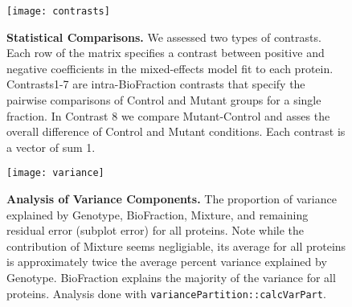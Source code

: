 \begin{figure}[h] %
  \begin{fullwidth}
  \begin{center}
	  \texttt{[image: contrasts]}
	  \caption{\textbf{Statistical Comparisons.} We assessed two types of
	  contrasts. Each row of the matrix specifies a contrast between
	  positive and negative coefficients in the mixed-effects model fit to
	  each protein. Contrasts1-7 are intra-BioFraction contrasts that
	  specify the pairwise comparisons of Control and Mutant groups for a
	  single fraction. In Contrast 8 we compare Mutant-Control and asses
	  the overall difference of Control and Mutant conditions.  Each
	  contrast is a vector of sum 1.}
	  \label{fig:contrasts}
  \end{center}
  \end{fullwidth}
\end{figure}


\begin{figure}[h] %
  \begin{fullwidth}
  \begin{center}
	  \texttt{[image: variance]}
	  \caption{\textbf{Analysis of Variance Components.} 
	  The proportion of variance explained by Genotype, BioFraction,
	  Mixture, and remaining residual error (subplot error) for all
	  proteins. Note while the contribution of Mixture seems negligiable,
	  its average for all proteins is approximately twice the average
	  percent variance explained by Genotype. BioFraction explains the
	  majority of the variance for all proteins. Analysis done with
	  \texttt{variancePartition::calcVarPart}.}
	  \label{fig:variance}
  \end{center}
  \end{fullwidth}
\end{figure}
